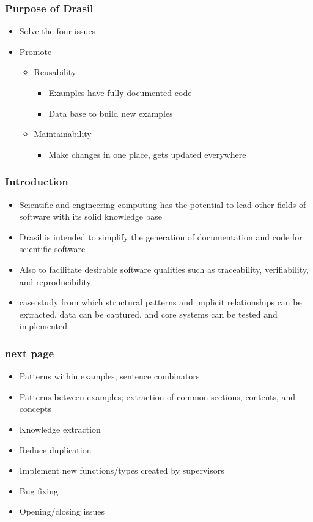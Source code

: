 \documentclass{beamer}
\begin{document}
\begin{frame}
\frametitle{Purpose of Drasil}
\begin{itemize}
  \item Solve the four issues
  \item Promote 
    \begin{itemize}
      \item Reusability 
        \begin{itemize}
          \item Examples have fully documented code
          \item Data base to build new examples
        \end{itemize}
      \item Maintainability
        \begin{itemize}
          \item Make changes in one place, gets updated everywhere
        \end{itemize}
    \end{itemize}
\end{itemize}
\end{frame}

\begin{frame}
\frametitle{Introduction}
\begin{itemize}
 \item<1-> Scientific and engineering computing has the potential to lead other fields of software with its solid knowledge base
 \item<2-> Drasil is intended to simplify the generation of documentation and code for scientific software
 \item<3-> Also to facilitate desirable software qualities such as traceability, verifiability, and reproducibility
 \item<4-> case study from which structural patterns and implicit relationships can be extracted, data can be captured, and core systems can be tested and implemented
\end{itemize}
\end{frame}

\begin{frame}
\frametitle{next page}
\begin{itemize}
 \item<1-> Patterns within examples; sentence combinators
 \item<2-> Patterns between examples; extraction of common sections, contents, and concepts
 \item<3-> Knowledge extraction
 \item<4-> Reduce duplication
 \item<5-> Implement new functions/types created by supervisors
 \item<6-> Bug fixing
 \item<7-> Opening/closing issues
\end{itemize}
\end{frame}
\end{document}
